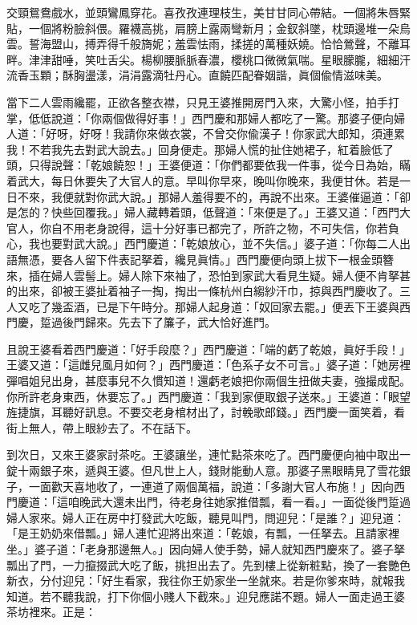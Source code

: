 \begin{myquote} 
交頸鴛鴦戲水，並頭鸞鳳穿花。喜孜孜連理枝生，美甘甘同心帶結。一個將朱唇緊貼，一個將粉臉斜偎。羅襪高挑，肩膀上露兩彎新月；金釵斜墜，枕頭邊堆一朵烏雲。{}誓海盟山，搏弄得千般旖妮；羞雲怯雨，揉搓的萬種妖嬈。恰恰鶯聲，不離耳畔。津津甜唾，笑吐舌尖。楊柳腰脈脈春濃，櫻桃口微微氣喘。星眼朦朧，細細汗流香玉顆；酥胸盪漾，涓涓露滴牡丹心。直饒匹配眷姻諧，眞個偸情滋味美。
\end{myquote} 

當下二人雲雨纔罷，正欲各整衣襟，只見王婆推開房門入來，大驚小怪，拍手打掌，低低說道：{}「你兩個做得好事！」西門慶和那婦人都吃了一驚。那婆子便向婦人道：「好呀，好呀！我請你來做衣裳，不曾交你偸漢子！{}你家武大郎知，須連累我！不若我先去對武大說去。」回身便走。那婦人慌的扯住她裙子，紅着臉低了頭，只得說聲：「乾娘饒恕！」{}王婆便道：「你們都要依我一件事，從今日為始，瞞着武大，每日休要失了大官人的意。早叫你早來，晚叫你晚來，我便甘休。若是一日不來，我便就對你武大說。」那婦人羞得要不的，再說不出來。王婆催逼道：「卻是怎的？快些回覆我。」婦人藏轉着頭，低聲道：「來便是了。」王婆又道：「西門大官人，你自不用老身說得，這十分好事已都完了，所許之物，不可失信，{}你若負心，我也要對武大說。」西門慶道：「乾娘放心，並不失信。」婆子道：「你每二人出語無憑，要各人留下件表記拏着，纔見眞情。」西門慶便向頭上拔下一根金頭簪來，插在婦人雲髻上。婦人除下來袖了，恐怕到家武大看見生疑。婦人便不肯拏甚的出來，卻被王婆扯着袖子一掏，掏出一條杭州白縐紗汗巾，掠與西門慶收了。{}三人又吃了幾盃酒，已是下午時分。那婦人起身道：「奴回家去罷。」便丟下王婆與西門慶，踅過後門歸來。先去下了簾子，武大恰好進門。

且說王婆看着西門慶道：「好手段麼？」西門慶道：「端的虧了乾娘，眞好手段！」王婆又道：「這雌兒風月如何？」西門慶道：「色系子女不可言。」婆子道：「她房裡彈唱姐兒出身，甚麼事兒不久慣知道！還虧老娘把你兩個生扭做夫妻，強撮成配。你所許老身東西，休要忘了。」西門慶道：「我到家便取銀子送來。」王婆道：「眼望旌捷旗，耳聽好訊息。不要交老身棺材出了，討輓歌郎錢。」{}西門慶一面笑着，看街上無人，帶上眼紗去了。不在話下。

到次日，又來王婆家討茶吃。王婆讓坐，連忙點茶來吃了。西門慶便向袖中取出一錠十兩銀子來，遞與王婆。但凡世上人，錢財能動人意。那婆子黑眼睛見了雪花銀子，一面歡天喜地收了，一連道了兩個萬福，說道：「多謝大官人布施！」{}因向西門慶道：「這咱晚武大還未出門，待老身往她家推借瓢，看一看。」一面從後門踅過婦人家來。婦人正在房中打發武大吃飯，聽見叫門，問迎兒：「是誰？」迎兒道：「是王奶奶來借瓢。」婦人連忙迎將出來道：「乾娘，有瓢，一任拏去。且請家裡坐。」婆子道：「老身那邊無人。」因向婦人使手勢，婦人就知西門慶來了。{}婆子拏瓢出了門，一力攛掇武大吃了飯，挑担出去了。先到樓上從新粧點，換了一套艷色新衣，分付迎兒：「好生看家，我往你王奶家坐一坐就來。若是你爹來時，就報我知道。若不聽我說，打下你個小賤人下截來。」迎兒應諾不題。婦人一面走過王婆茶坊裡來。正是：

